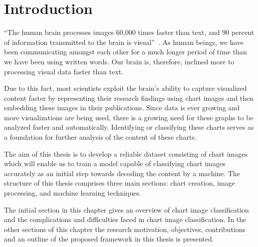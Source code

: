\documentclass[12pt, a4paper,oneside]{report}
\begin{document}

\setcounter{tocdepth}{10}

\clearpage
\tableofcontents





\listoffigures
\listoftables

\titleformat{\chapter}{\LARGE\bfseries}{\thechapter}{1em}{}

\newpage


\newpage
\chapter{Introduction}
``The human brain processes images 60,000 times faster than text, and 90 percent of information transmitted to the brain is visual''~\cite{humaneye}. As human beings, we have been communicating amongst each other for a much longer period of time than we have been using written words. Our brain is, therefore, inclined more to processing visual data faster than text.

Due to this fact, most scientists exploit the brain's ability to capture visualized content faster by representing their research findings using chart images and then embedding these images in their publications. Since data is ever growing and more visualizations are being used, there is a growing need for these graphs to be analyzed faster and automatically. Identifying or classifying these charts serves as a foundation for further analysis of the content of these charts.  

The aim of this thesis is to develop a reliable dataset consisting of chart images which will enable us to train a model capable of classifying chart images accurately as an initial step towards decoding the content by a machine. The structure of this thesis comprises three main sections: chart creation, image processing, and machine learning techniques.

The initial section in this chapter gives an overview of chart image classification and the complications and difficulties faced in chart image classification. In the other sections of this chapter the research motivation, objectives, contributions and an outline of the proposed framework in this thesis is presented.
\end{document}
